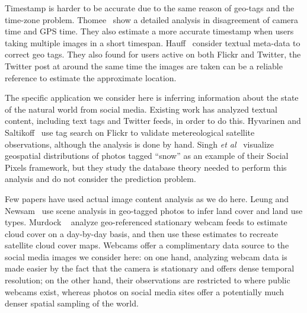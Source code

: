 Timestamp is harder to be accurate due to the same reason of geo-tags and the time-zone problem. 
Thomee\etal~\cite{thomee2014s}  show  a detailed analysis in disagreement of camera time and GPS time. They also estimate a more accurate timestamp when users taking multiple images in a short timespan.
Hauff\etal~\cite{hauff2012geo} consider textual meta-data to correct geo tags. 
They also found for users active on both Flickr and Twitter, the Twitter post at around the same time the images are taken can be a reliable reference to estimate the approximate location.





The specific application we consider here is inferring
information about the state of the natural world from social media.
Existing work has analyzed textual content, including text tags and
Twitter feeds, in order to do this. Hyvarinen and
Saltikoff~\cite{meteo} use tag search on Flickr to validate
metereological satellite observations, although the analysis is done
by hand. Singh \textit{et al}~\cite{singh10socialpixels} visualize geospatial
distributions of photos tagged ``snow'' as an example of
their Social Pixels framework, but they study the
database theory needed to perform this analysis
and do not consider the prediction problem.  





Few papers have used actual image content
analysis as we do here. Leung and Newsam~\cite{Leung:2010wa} use scene
analysis in geo-tagged photos to infer land cover and land use types.
Murdock \etal~\cite{murdock} analyze geo-referenced
stationary webcam feeds to estimate cloud cover on a day-by-day
basis, and then use these estimates to recreate satellite cloud cover
maps.  Webcams offer a complimentary data source to the social media
images we consider here: on one hand, analyzing webcam data is made
easier by the fact that the camera is stationary and offers dense
temporal resolution; on the other hand, their observations are restricted to 
where public webcams exist, whereas photos on social media sites 
offer a potentially much denser spatial sampling of the world.

